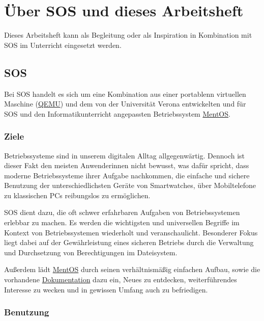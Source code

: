 \documentclass[12pt, a4paper]{article}
\begin{document}
\newpage
{}

\section*{Über \gls{SOS} und dieses Arbeitsheft}

Dieses Arbeitsheft kann als Begleitung oder als Inspiration in Kombination mit \gls{SOS} im Unterricht eingesetzt werden.

\subsection*{\acrfull{SOS}}

Bei \gls{SOS} handelt es sich um eine Kombination aus einer portablenn virtuellen Maschine (\href{https://www.qemu.org/}{QEMU}) und dem von der Universität Verona entwickelten und für \gls{SOS} und den Informatikunterricht angepassten Betriebssystem \href{https://mentos-team.github.io/}{MentOS}.

\subsubsection*{Ziele}

Betriebssysteme sind in unserem digitalen Alltag allgegenwärtig.
Dennoch ist dieser Fakt den meisten Anwenderinnen nicht bewusst, was dafür spricht, dass moderne Betriebssysteme ihrer Aufgabe nachkommen, die einfache und sichere Benutzung der unterschiedlichsten Geräte von Smartwatches, über Mobiltelefone zu klassischen PCs reibungslos zu ermöglichen.

\gls{SOS} dient dazu, die oft schwer erfahrbaren Aufgaben von Betriebssystemen erlebbar zu machen.
Es werden die wichtigsten und universellen Begriffe im Kontext von Betriebssystemen wiederholt und veranschaulicht.
Besonderer Fokus liegt dabei auf der Gewährleistung eines sicheren Betriebs durch die Verwaltung und Durchsetzung von Berechtigungen im Dateisystem.

Außerdem lädt \href{https://github.com/mentos-team/MentOS}{MentOS} durch seinen verhältnismäßig einfachen Aufbau, sowie die vorhandene \href{https://mentos-team.github.io/doc/doxygen/index.html}{Dokumentation} dazu ein, Neues zu entdecken, weiterführendes Interesse zu wecken und in gewissen Umfang auch zu befriedigen.

\subsubsection*{Benutzung}
\end{document}

